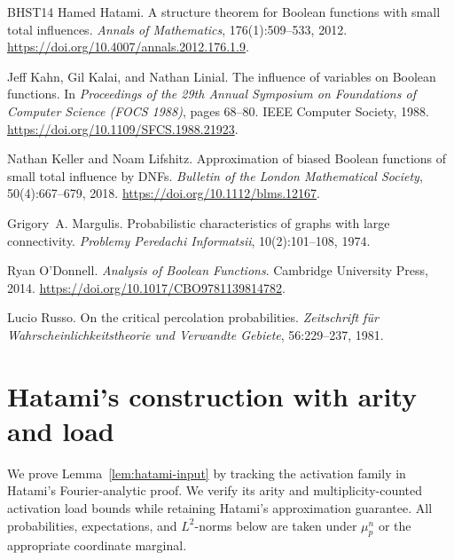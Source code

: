 \documentclass[11pt,letterpaper]{article}
\theoremstyle{definition}
\theoremstyle{remark}
\begin{document}
\begin{thebibliography}{BHST14}
Hamed Hatami.
\newblock A structure theorem for Boolean functions with small total
  influences.
\newblock \emph{Annals of Mathematics}, 176(1):509--533, 2012.
\newblock \url{https://doi.org/10.4007/annals.2012.176.1.9}.

Jeff Kahn, Gil Kalai, and Nathan Linial.
\newblock The influence of variables on Boolean functions.
\newblock In \emph{Proceedings of the 29th Annual Symposium on Foundations of
  Computer Science (FOCS 1988)},
  pages 68--80. IEEE Computer Society, 1988.
\newblock \url{https://doi.org/10.1109/SFCS.1988.21923}.

Nathan Keller and Noam Lifshitz.
\newblock Approximation of biased Boolean functions of small total influence
  by DNFs.
\newblock \emph{Bulletin of the London Mathematical Society},
  50(4):667--679, 2018.
\newblock \url{https://doi.org/10.1112/blms.12167}.

Grigory~A. Margulis.
\newblock Probabilistic characteristics of graphs with large connectivity.
\newblock \emph{Problemy Peredachi Informatsii}, 10(2):101--108, 1974.

Ryan O'Donnell.
\newblock \emph{Analysis of Boolean Functions}.
\newblock Cambridge University Press, 2014.
\newblock \url{https://doi.org/10.1017/CBO9781139814782}.

Lucio Russo.
\newblock On the critical percolation probabilities.
\newblock \emph{Zeitschrift f\"ur Wahrscheinlichkeitstheorie und Verwandte
  Gebiete}, 56:229--237, 1981.

\end{thebibliography}

\appendix

\section{Hatami's construction with arity and load}
\label{app:hatami}

We prove Lemma~\ref{lem:hatami-input} by tracking the activation family in
Hatami's Fourier-analytic proof.  We verify its arity and
multiplicity-counted activation load bounds while retaining Hatami's
approximation guarantee.  All
probabilities, expectations, and $L^2$-norms below are taken under $\mu_p^n$
or the appropriate coordinate marginal.
\end{document}
